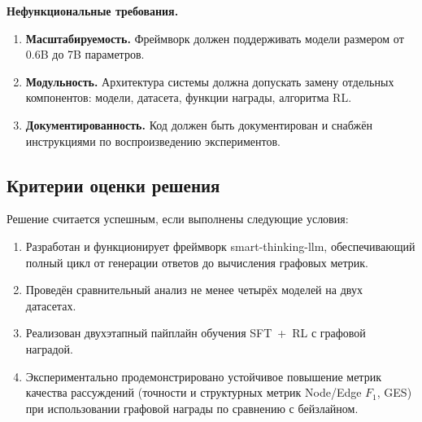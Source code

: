 \textbf{Нефункциональные требования.}

\begin{enumerate}
    \item \textbf{Масштабируемость.} Фреймворк должен поддерживать модели размером от 0.6B до 7B параметров.
    \item \textbf{Модульность.} Архитектура системы должна допускать замену отдельных компонентов: модели, датасета, функции награды, алгоритма RL.
    \item \textbf{Документированность.} Код должен быть документирован и снабжён инструкциями по воспроизведению экспериментов.
\end{enumerate}

\subsection{Критерии оценки решения}
\label{subsec:criteria}

Решение считается успешным, если выполнены следующие условия:
\begin{enumerate}
    \item Разработан и функционирует фреймворк smart-thinking-llm, обеспечивающий полный цикл от генерации ответов до вычисления графовых метрик.
    \item Проведён сравнительный анализ не менее четырёх моделей на двух датасетах.
    \item Реализован двухэтапный пайплайн обучения SFT~+~RL с графовой наградой.
    \item Экспериментально продемонстрировано устойчивое повышение метрик качества рассуждений (точности и структурных метрик Node/Edge $F_1$, GES) при использовании графовой награды по сравнению с бейзлайном.
\end{enumerate}
